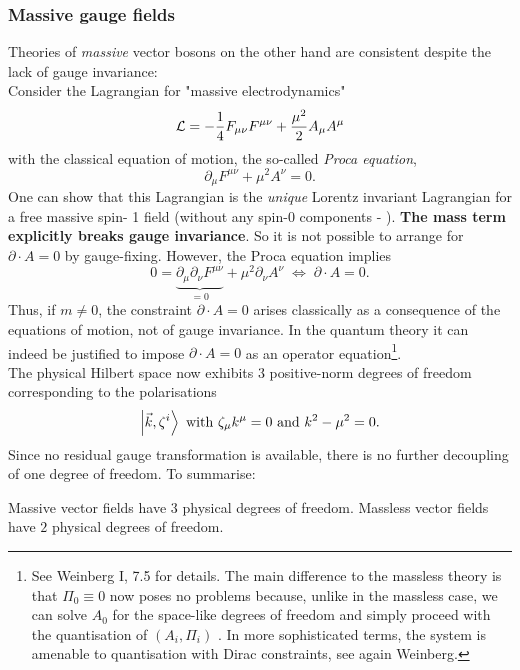 \subsubsection{Massive gauge fields}
Theories of \emph{massive} vector bosons on the other hand are consistent despite the lack of gauge invariance: \\
Consider the Lagrangian for "massive electrodynamics"
\begin{equation}
\mathcal{L} = -\frac{1}{4} F_{\mu \nu} F^{\mu \nu} + \frac{\mu^2}{2} A_\mu A^\mu
\end{equation}
with the classical equation of motion, the so-called \emph{Proca equation},
\begin{equation}
\partial_\mu F^{\mu \nu} + \mu^2 A^\nu =0.
\end{equation}
One can show that this Lagrangian is the \emph{unique} Lorentz invariant Lagrangian for a free massive spin-
1 field (without any spin-0 components - ). \textbf{The mass term explicitly
breaks gauge invariance}. So it is not possible to arrange for $\partial \cdot  A = 0$ by gauge-fixing. However, the
Proca equation implies
\begin{equation}
	0= \underbrace{\partial_\mu \partial_\nu F^{\mu \nu}}_{=0}+\mu^2\partial_\nu A^\nu \; \Leftrightarrow \; \partial\cdot A =0.
\end{equation}
Thus, if $m\neq 0$, the constraint $\partial \cdot A = 0$ arises classically as a consequence of the equations of motion,
not of gauge invariance. In the quantum theory it can indeed be justified to impose $\partial \cdot  A = 0$ as
an operator equation\footnote{See Weinberg I, 7.5 for details. The main difference to the massless theory is that $\Pi_0≡ 0$ now poses no problems
	because, unlike in the massless case, we can solve $A_0$ for the space-like degrees of freedom and simply proceed with the
	quantisation of $( A_i , \Pi_i )$ . In more sophisticated terms, the system is amenable to quantisation with Dirac constraints, see
	again Weinberg.}.\\
The physical Hilbert space now exhibits $3$ positive-norm degrees of freedom
corresponding to the polarisations
\begin{equation}
\ket{\vec{k},\zeta^i} \text{  with  } \zeta_\mu k^\mu=0 \text{ and } k^2-\mu^2=0.
\end{equation}
Since no residual gauge transformation is available, there is no further decoupling of one degree of
freedom. To summarise:
\begin{statements}
	Massive vector fields have $3$ physical degrees of freedom.
	Massless vector fields have $2$ physical degrees of freedom.
\end{statements}
